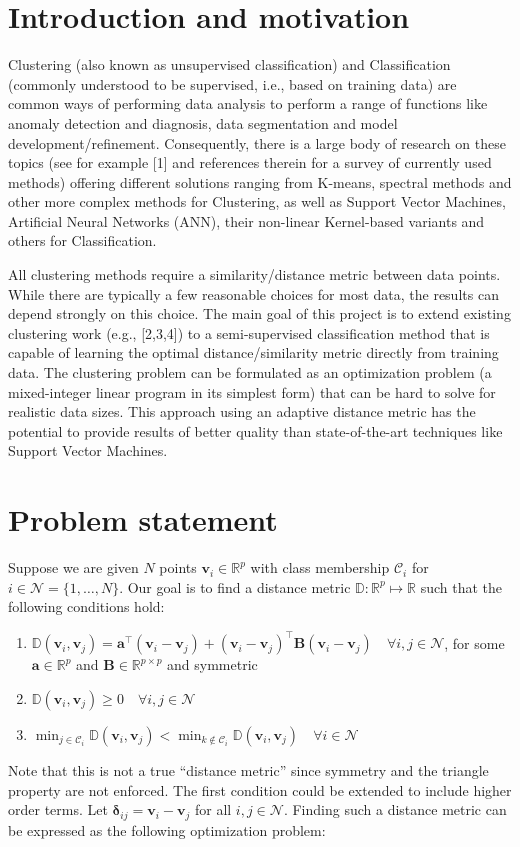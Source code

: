\documentclass[]{article}
\renewcommand{\v}[1]{\ensuremath{\mathbf{#1}}}
\newcommand{\mc}{\mathcal}
\newcommand{\D}{\mathbb{D}} %
\renewcommand{\Re}{\mathbb{R}} %
\newcommand{\vdelta}{\boldsymbol{\delta}}
\begin{document}
\section{Introduction and motivation}

Clustering (also known as unsupervised classification) and Classification (commonly understood to be supervised, i.e., based on training data) are common ways of performing data analysis to perform a range of functions like anomaly detection and diagnosis, data segmentation and model development/refinement. Consequently, there is a large body of research on these topics (see for example [1] and references therein for a survey of currently used methods) offering different solutions ranging from K-means, spectral methods and other more complex methods for Clustering, as well as Support Vector Machines, Artificial Neural Networks (ANN), their non-linear Kernel-based variants and others for Classification.

All clustering methods require a similarity/distance metric between data points. While there are typically a few reasonable choices for most data, the results can depend strongly on this choice. The main goal of this project is to extend existing clustering work (e.g., [2,3,4]) to a semi-supervised classification method that is capable of learning the optimal distance/similarity metric directly from training data. The clustering problem can be formulated as an optimization problem (a mixed-integer linear program in its simplest form) that can be hard to solve for realistic data sizes. This approach using an adaptive distance metric has the potential to provide results of better quality than state-of-the-art techniques like Support Vector Machines.  


\section{Problem statement}

Suppose we are given $N$ points $\v{v}_i \in \Re^p$ with class membership $\mc{C}_i$ for $i \in \mc{N} = \{1,\dots,N\}$.
Our goal is to find a distance metric $\D: \Re^p \mapsto \Re$ such that the following conditions hold:
\begin{enumerate}
\item $\D(\v{v}_i,\v{v}_j) = \v{a}^{\top}(\v{v}_i - \v{v}_j) + (\v{v}_i - \v{v}_j)^{\top} \v{B}(\v{v}_i - \v{v}_j) \quad \forall i,j \in \mc{N}$, for some $\v{a} \in \Re^p$ and $\v{B} \in \Re^{p \times p}$ and symmetric
\item $\D(\v{v}_i,\v{v}_j) \geq 0 \quad \forall i,j \in \mc{N}$
\item $\min_{j \in \mc{C}_i} \D(\v{v}_i,\v{v}_j) < \min_{k \notin \mc{C}_i} \D(\v{v}_i,\v{v}_j) \quad \forall i \in \mc{N}$
\end{enumerate}
Note that this is not a true ``distance metric'' since symmetry and the triangle property are not enforced.
The first condition could be extended to include higher order terms.
Let $\vdelta_{ij} = \v{v}_i - \v{v}_j$ for all $i,j \in \mc{N}$.
Finding such a distance metric can be expressed as the following optimization problem:
\end{document}
